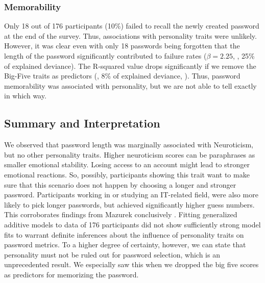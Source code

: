 \subsubsection{Memorability}
Only 18 out of 176 participants (10\%) failed to recall the newly created password at the end of the survey. Thus, associations with personality traits were unlikely. However, it was clear even with only 18 passwords being forgotten that the length of the password significantly contributed to failure rates ($\beta=2.25$, , 25\% of explained deviance). The R-squared value drops significantly if we remove the Big-Five traits as predictors (, 8\% of explained deviance, ). Thus, password memorability was associated with personality, but we are not able to tell exactly in which way. 


\subsection{Summary and Interpretation}
We observed that password length was marginally associated with Neuroticism, but no other personality traits. Higher neuroticism scores can be paraphrases as smaller emotional stability. Losing access to an account might lead to stronger emotional reactions. So, possibly, participants showing this trait want to make sure that this scenario does not happen by choosing a longer and stronger password. Participants working in or studying an IT-related field, were also more likely to pick longer passwords, but achieved significantly higher guess numbers. This corroborates findings from Mazurek \etal conclusively \cite{Mazurek2013Measuring}. Fitting generalized additive models to data of 176 participants did not show sufficiently strong model fits to warrant definite inferences about the influence of personality traits on password metrics. To a higher degree of certainty, however, we can state that personality must not be ruled out for password selection, which is an unprecedented result. We especially saw this when we dropped the big five scores as predictors for memorizing the password. 

